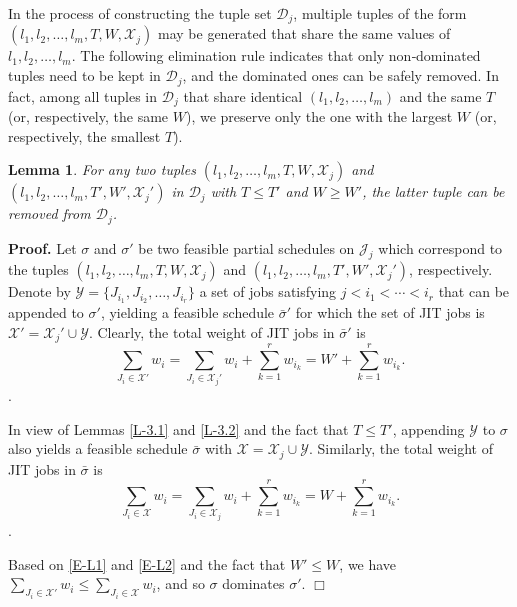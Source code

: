 \documentclass[12pt, eqno, limlimits]{article}
\newtheorem{lemma}{Lemma}[section]
\begin{document}
\begin{sloppypar}
        In the process of constructing the tuple set $\mathcal{D}_j$, multiple tuples of the form $(l_1, l_2, \ldots, l_m, T, W, \mathcal{X}_j)$ may be generated that share the same values of $l_1, l_2, \ldots, l_m$. The following elimination rule indicates that only non‑dominated tuples need to be kept in $\mathcal{D}_j$, and the dominated ones can be safely removed. In fact, among all tuples in $\mathcal{D}_j$ that share identical $(l_1, l_2, \ldots, l_m)$ and the same $T$ (or, respectively, the same $W$), we preserve only the one with the largest $W$ (or, respectively, the smallest $T$).
        
        \begin{lemma} \label{L-3.3}
            For any two tuples $(l_1, l_2, \ldots, l_m, T, W, \mathcal{X}_j)$ and $(l_1, l_2, \ldots, l_m, T', W', \mathcal{X}_j')$ in $\mathcal{D}_j$ with $T \leq T'$ and $W \geq W'$, the latter tuple can be removed from $\mathcal{D}_j$.
        \end{lemma}
        
        \noindent \textbf{Proof.} Let $\sigma$ and $\sigma'$ be two feasible partial schedules on $\mathcal{J}_j$ which correspond to the tuples $(l_1, l_2, \ldots, l_m, T, W, \mathcal{X}_j)$ and $(l_1, l_2, \ldots, l_m, T', W', \mathcal{X}_j')$, respectively. Denote by $\mathcal{Y}=\{J_{i_1}, J_{i_2}, \ldots, J_{i_r}\}$ a set of jobs satisfying $j < i_1 < \cdots <i_r$ that can be appended to $\sigma'$, yielding a feasible schedule $\bar{\sigma}'$ for which the set of JIT jobs is
        $\mathcal{X}'=\mathcal{X}_j' \cup \mathcal{Y}$. Clearly, the total weight of JIT jobs in $\bar{\sigma}'$ is 
        \begin{equation}\label{E-L1}
            \sum_{J_i \in \mathcal{X}'} w_i=\sum_{J_i \in \mathcal{X}_j'} w_i+\sum_{k=1}^r w_{i_k}=W'+\sum_{k=1}^r w_{i_k}.
        \end{equation}.
        
        In view of Lemmas \ref{L-3.1} and \ref{L-3.2} and the fact that $T \leq T'$, appending $\mathcal{Y}$ to $\sigma$ also yields a feasible schedule $\bar{\sigma}$ with $\mathcal{X}=\mathcal{X}_j \cup \mathcal{Y}$.
        Similarly, the total weight of JIT jobs in $\bar{\sigma}$ is 
        \begin{equation}\label{E-L2}
            \sum_{J_i \in \mathcal{X}} w_i=\sum_{J_i \in \mathcal{X}_j} w_i+\sum_{k=1}^r w_{i_k}=W+\sum_{k=1}^r w_{i_k}.
        \end{equation}.
        
        Based on \eqref{E-L1} and \eqref{E-L2} and the fact that $W' \leq W$, we have $\sum_{J_i \in \mathcal{X}'} w_i \leq \sum_{J_i \in \mathcal{X}} w_i$, and so $\sigma$ dominates $\sigma'$.  \hfill$\Box$\\
        

\end{sloppypar}
\end{document}
